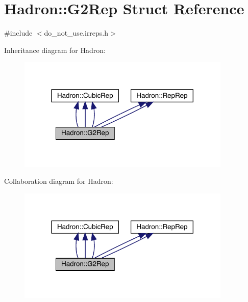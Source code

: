 \hypertarget{structHadron_1_1G2Rep}{}\section{Hadron\+:\+:G2\+Rep Struct Reference}
\label{structHadron_1_1G2Rep}


{\ttfamily \#include $<$do\+\_\+not\+\_\+use.\+irreps.\+h$>$}



Inheritance diagram for Hadron\+:
\nopagebreak
\begin{figure}[H]
\begin{center}
\leavevmode
\includegraphics[width=288pt]{d2/d56/structHadron_1_1G2Rep__inherit__graph}
\end{center}
\end{figure}


Collaboration diagram for Hadron\+:
\nopagebreak
\begin{figure}[H]
\begin{center}
\leavevmode
\includegraphics[width=288pt]{dd/d5d/structHadron_1_1G2Rep__coll__graph}
\end{center}
\end{figure}
